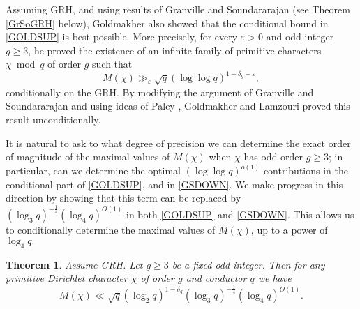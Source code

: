 \documentclass[12pt]{amsart}
\newtheorem{thm}{Theorem}[section]
\theoremstyle{definition}
\numberwithin{equation}{section}
\begin{document}
Assuming GRH, and using results of Granville and Soundararajan (see Theorem \ref{GrSoGRH} below), Goldmakher \cite{GOLD} also showed that the conditional bound in \eqref{GOLDSUP} is best possible. More precisely, for every $\varepsilon>0$ and odd integer $g\geq 3$, he proved the existence of an infinite family of primitive characters $\chi\bmod q$ of order $g$ such that 
\begin{equation}\label{GSDOWN}
M(\chi) \gg_{\varepsilon} \sqrt{q}(\log\log q)^{1-\delta_g -\varepsilon},
\end{equation}
 conditionally on the GRH. By modifying the argument of Granville and Soundararajan and using ideas of Paley \cite{Pa}, Goldmakher and Lamzouri \cite{GL1} proved this result unconditionally. 

It is natural to ask to what degree of precision we can determine the exact order of magnitude of the maximal values of $M(\chi)$ when $\chi$ has odd order $g\geq 3$; in particular, can we determine the optimal $(\log\log q)^{o(1)}$ contributions in the conditional part of \eqref{GOLDSUP}, and in \eqref{GSDOWN}. We make progress in this direction by showing that this term can be replaced by $(\log_3 q)^{-\frac{1}{4}}(\log _4q)^{O(1)}$ in both  \eqref{GOLDSUP} and \eqref{GSDOWN}. This allows us to conditionally determine the maximal values of $M(\chi)$, up to a power of $\log_4 q.$ %
\begin{thm}\label{MCHIUP2}
Assume GRH. Let $g \geq 3$ be a fixed odd integer. Then for any primitive Dirichlet character $\chi$ of order $g$ and conductor $q$ we have
\begin{equation}\label{PREC0}
M(\chi) \ll \sqrt{q} \left(\log_2 q\right)^{1-\delta_g}(\log_3 q)^{-\frac{1}{4}}(\log_4q)^{O(1)}.
\end{equation}
\end{thm} 
\end{document}
